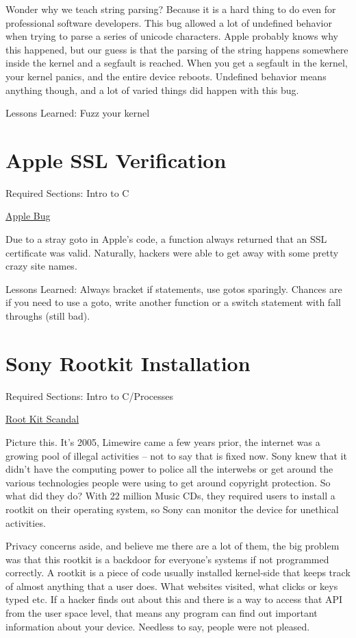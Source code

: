 Wonder why we teach string parsing? Because it is a hard thing to do even for professional software developers. This bug allowed a lot of undefined behavior when trying to parse a series of unicode characters.
Apple probably knows why this happened, but our guess is that the parsing of the string happens somewhere inside the kernel and a segfault is reached.
When you get a segfault in the kernel, your kernel panics, and the entire device reboots.
Undefined behavior means anything though, and a lot of varied things did happen with this bug.

Lessons Learned: Fuzz your kernel

\section{Apple SSL Verification}

Required Sections: Intro to C

\href{https://en.wikipedia.org/wiki/Unreachable_code#Examples}{Apple Bug}


Due to a stray goto in Apple's code, a function always returned that an SSL certificate was valid.
Naturally, hackers were able to get away with some pretty crazy site names.

Lessons Learned: Always bracket if statements, use gotos sparingly. Chances are if you need to use a goto, write another function or a switch statement with fall throughs (still bad).

\section{Sony Rootkit Installation}

Required Sections: Intro to C/Processes

\href{https://en.wikipedia.org/wiki/Sony_BMG_copy_protection_rootkit_scandal}{Root Kit Scandal}

Picture this.
It's 2005, Limewire came a few years prior, the internet was a growing pool of illegal activities -- not to say that is fixed now.
Sony knew that it didn't have the computing power to police all the interwebs or get around the various technologies people were using to get around copyright protection.
So what did they do?
With 22 million Music CDs, they required users to install a rootkit on their operating system, so Sony can monitor the device for unethical activities.

Privacy concerns aside, and believe me there are a lot of them, the big problem was that this rootkit is a backdoor for everyone's systems if not programmed correctly.
A rootkit is a piece of code usually installed kernel-side that keeps track of almost anything that a user does.
What websites visited, what clicks or keys typed etc.
If a hacker finds out about this and there is a way to access that API from the user space level, that means any program can find out important information about your device.
Needless to say, people were not pleased.

